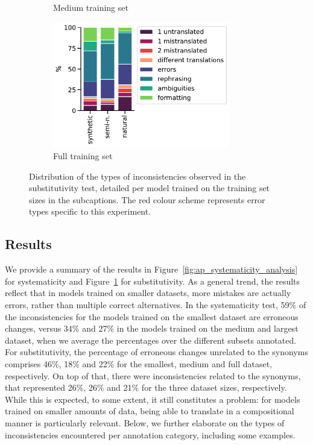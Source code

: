 \begin{figure}[t]
\begin{subfigure}[b]{0.22\textwidth}
\caption{Medium training set}
\end{subfigure}
\begin{subfigure}[b]{0.43\textwidth}\centering
\includegraphics[width=0.85\textwidth]{figures/analysis_appendix/substitutivity_full.pdf}
\caption{Full training set}
\end{subfigure}
\caption{Distribution of the types of inconsistencies observed in the substitutivity test, detailed per model trained on the training set sizes in the subcaptions.
The red colour scheme represents error types specific to this experiment.}
\label{fig:ap_substitutivity_analysis}
\vspace{-.3cm}
\end{figure}

\subsection{Results}

We provide a summary of the results in Figure~\ref{fig:ap_systematicity_analysis} for systematicity and Figure~\ref{fig:ap_substitutivity_analysis} for substitutivity.
As a general trend, the results reflect that in models trained on smaller datasets, more mistakes are actually errors, rather than multiple correct alternatives.
In the systematicity test, 59\% of the inconsistencies for the models trained on the smallest dataset are erroneous changes, versus 34\% and 27\% in the models trained on the medium and largest dataset,
when we average the percentages over the different subsets annotated.
For substitutivity, the percentage of erroneous changes unrelated to the synonyms comprises 46\%, 18\% and 22\% for the smallest, medium and full dataset, respectively.
On top of that, there were inconsistencies related to the synonyms, that represented 26\%, 26\% and 21\% for the three dataset sizes, respectively.
While this is expected, to some extent, it still constitutes a problem: for models trained on smaller amounts of data, being able to translate in a compositional manner is particularly relevant.
Below, we further elaborate on the types of inconsistencies encountered per annotation category, including some examples.

